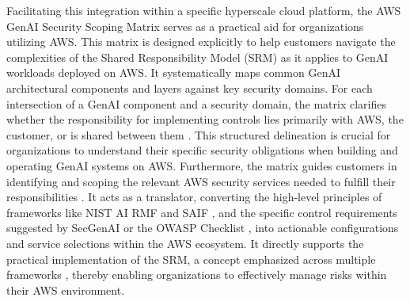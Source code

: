 Facilitating this integration within a specific hyperscale cloud platform, the AWS GenAI Security Scoping Matrix serves as a practical aid for organizations utilizing AWS\cite{noauthor_securing_nodate}. This matrix is designed explicitly to help customers navigate the complexities of the Shared Responsibility Model (SRM) as it applies to GenAI workloads deployed on AWS. It systematically maps common GenAI architectural components and layers against key security domains\cite{noauthor_securing_nodate}. For each intersection of a GenAI component and a security domain, the matrix clarifies whether the responsibility for implementing controls lies primarily with AWS, the customer, or is shared between them \cite{noauthor_securing_nodate}. This structured delineation is crucial for organizations to understand their specific security obligations when building and operating GenAI systems on AWS. Furthermore, the matrix guides customers in identifying and scoping the relevant AWS security services needed to fulfill their responsibilities \cite{noauthor_securing_nodate}. It acts as a translator, converting the high-level principles of frameworks like NIST AI RMF \cite{tabassi_artificial_2023} and SAIF \cite{hansen_introducing_2023}, and the specific control requirements suggested by SecGenAI \cite{haryanto_secgenai_2024} or the OWASP Checklist \cite{OWASP:2024:LLMChecklist}, into actionable configurations and service selections within the AWS ecosystem. It directly supports the practical implementation of the SRM, a concept emphasized across multiple frameworks \cite{tabassi_artificial_2023, hansen_introducing_2023, haryanto_secgenai_2024, OWASP:2024:LLMChecklist}, thereby enabling organizations to effectively manage risks within their AWS environment.

